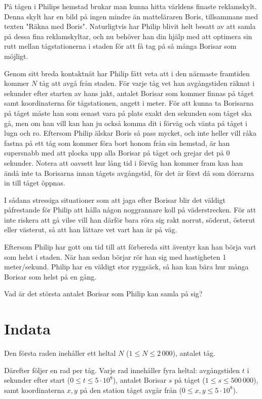 På tågen i Philips hemstad brukar man kunna hitta världens finaste reklamskylt. Denna skylt har en bild på ingen mindre än matteläraren Boris, tillsammans med texten "Räkna med Boris". 
Naturligtvis har Philip blivit helt besatt av att samla på dessa fina reklamskyltar, och nu behöver han din hjälp med att optimera sin rutt mellan tågstationerna i staden för att få tag på så många Borisar som möjligt.

Genom sitt breda kontaktnät har Philip fått veta att i den närmaste framtiden kommer $N$ tåg att avgå från staden. För varje tåg vet han avgångstiden räknat i sekunder efter starten av hans jakt, antalet Borisar som kommer finnas på tåget samt koordinaterna för tågstationen, angett i meter.
För att kunna ta Borisarna på tåget måste han som senast vara på plats exakt den sekunden som tåget ska gå, men om han vill kan han ju också komma dit i förväg och vänta på tåget i lugn och ro.
Eftersom Philip älskar Boris så pass mycket, och inte heller vill råka fastna på ett tåg som kommer föra bort honom från sin hemstad, är han supersnabb med att plocka upp alla Borisar på tåget och grejar det på 0 sekunder. 
Notera att oavsett hur lång tid i förväg han kommer fram kan han ändå inte ta Borisarna innan tågets avgångstid, för det är först då som dörrarna in till tåget öppnas.

I sådana stressiga situationer som att jaga efter Borisar blir det väldigt påfrestande för Philip att hålla någon noggrannare koll på väderstrecken. För att inte riskera att gå vilse vill han därför bara röra sig rakt norrut, söderut, österut eller västerut, så att han lättare vet vart han är på väg.

Eftersom Philip har gott om tid till att förbereda sitt äventyr kan han börja vart som helst i staden. När han sedan börjar rör han sig med hastigheten 1 meter/sekund. Philip har en väldigt stor ryggsäck, så han kan bära hur många Borisar som helst på en gång.

Vad är det största antalet Borisar som Philip kan samla på sig?

\section*{Indata}
Den första raden inehåller ett heltal $N$ ($1 \le N \le 2\,000$), antalet tåg. 

Därefter följer en rad per tåg.
Varje rad innehåller fyra heltal: avgångstiden $t$ i sekunder efter start ($0 \le t \le 5 \cdot 10^8$), antalet Borisar $s$ på tåget ($1 \le s \le 500\,000$), samt koordinaterna $x, y$ på den station tåget avgår från ($0 \le x, y \le 5 \cdot 10^8$).

